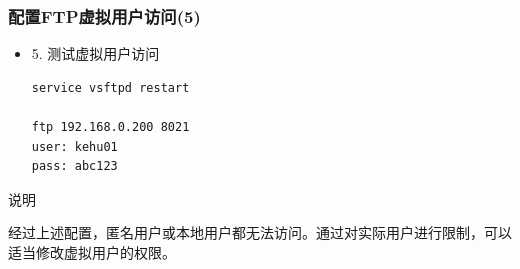 \documentclass[xcolor=svgnames,presentation]{beamer}
\begin{document}
\begin{frame}[fragile]
\frametitle{配置FTP虚拟用户访问(5)}
\label{sec-3-18}
\begin{itemize}

\item 5. 测试虚拟用户访问\\
\label{sec-3-18-1}%
\begin{verbatim}
service vsftpd restart

ftp 192.168.0.200 8021
user: kehu01
pass: abc123
\end{verbatim}
\end{itemize} %
\begin{block}{说明}
\label{sec-3-18-2}

经过上述配置，匿名用户或本地用户都无法访问。通过对实际用户进行限制，可以适当修改虚拟用户的权限。
\end{block}
\end{frame}
\end{document}
